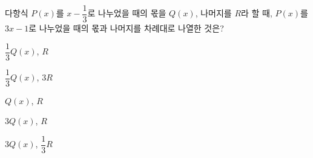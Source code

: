 다항식 $P(x)$를 $x-\dfrac{1}{3}$로 나누었을 때의 몫을 $Q(x)$, 나머지를 $R$라 할 때, $P(x)$를 $3x-1$로 나누었을 때의 몫과 나머지를 차례대로 나열한 것은?
\begin{choicesii}{\rule[-3ex]{0pt}{8ex}$\dfrac{1}{3}Q(x)$, $R$}{\rule[-3ex]{0pt}{8ex}$\dfrac{1}{3}Q(x)$, $3R$}{\rule[-3ex]{0pt}{8ex}$Q(x)$, $R$}{\rule[-3ex]{0pt}{8ex}$3Q(x)$, $R$}{\rule[-3ex]{0pt}{8ex}$3Q(x)$, $\dfrac{1}{3}R$}\end{choicesii}
